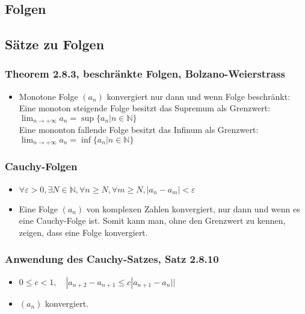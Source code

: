 \documentclass[a3paper, 11pt, landscape]{scrartcl}
\begin{document}
\begin{multicols*}{3}
	\section{Folgen}
        \subsection{Sätze zu Folgen}
        
        \subsubsection{Theorem 2.8.3, beschränkte Folgen, Bolzano-Weierstrass}
        \begin{itemize}
            \item Monotone Folge \( (a_n) \) konvergiert nur dann und wenn Folge beschränkt: \\
            Eine monoton steigende Folge besitzt das Supremum als Grenzwert: $\lim_{n\to +\infty}a_n = \sup\{a_n | n \in \mathbb{N} \}$ \\
            Eine mononton fallende Folge besitzt das Infinum als Grenzwert: $\lim_{n\to +\infty}a_n = \inf\{a_n | n \in \mathbb{N} \}$
        \end{itemize}
		
		\subsubsection{Cauchy-Folgen}
        \begin{itemize}
            \item $\forall \varepsilon>0, \exists N \in \mathbb{N}, \forall n \geqslant N, \forall m \geqslant N,\left|a_{n}-a_{m}\right|<\varepsilon$ 
            \item Eine Folge $(a_n)$ von komplexen Zahlen konvergiert, nur dann und wenn es eine Cauchy-Folge ist. Somit kann man, ohne den Grenzwert zu kennen, zeigen, dass eine Folge konvergiert.
        \end{itemize}
        
        \subsubsection{Anwendung des Cauchy-Satzes, Satz 2.8.10}
        \begin{itemize}
            \item $0 \leq c < 1, \quad | a_{n+2}-a_{n+1} \leq c | a_{n+1}-a_n | |$ 
            \item $(a_n)$ konvergiert.
        \end{itemize}
        

\end{multicols*}
\end{document}
